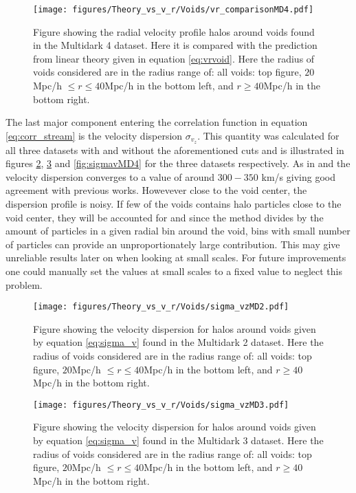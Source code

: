 \begin{figure}[htbp]
    \texttt{[image: figures/Theory\_vs\_v\_r/Voids/vr\_comparisonMD4.pdf]}
    \caption{Figure showing the radial velocity profile halos around voids found in the Multidark 4 dataset. Here it is compared with the prediction from linear theory given in equation \ref{eq:vrvoid}. Here the radius of voids considered are in the radius range of: all voids: top figure, $20$Mpc/h $\leq r\leq 40$Mpc/h in the bottom left, and $r\geq 40$Mpc/h in the bottom right.}
    \label{fig:vrMD4}
\end{figure}
The last major component entering the correlation function in equation \ref{eq:corr_stream} is the velocity dispersion $\sigma_{v_z}$. This quantity was calculated for all three datasets with and without the aforementioned cuts and is illustrated in figures \ref{fig:sigmavMD2}, \ref{fig:sigmavMD3} and \ref{fig:sigmavMD4} for the three datasets respectively. As in \cite{Nadathur_corr} and \cite{Achitouv_streaming} the velocity dispersion converges to a value of around $300-350$ km/s giving good agreement with previous works. Howevever close to the void center, the dispersion profile is noisy. If few of the voids contains halo particles close to the void center, they will be accounted for and since the method divides by the amount of particles in a given radial bin around the void, bins with small number of particles can provide an unproportionately large contribution. This may give unreliable results later on when looking at small scales. For future improvements one could manually set the values at small scales to a fixed value to neglect this problem.
\begin{figure}[htbp]
    \texttt{[image: figures/Theory\_vs\_v\_r/Voids/sigma\_vzMD2.pdf]}
    \caption{Figure showing the velocity dispersion for halos around voids given by equation \ref{eq:sigma_v} found in the Multidark 2 dataset. Here the radius of voids considered are in the radius range of: all voids: top figure, $20$Mpc/h $\leq r\leq 40$Mpc/h in the bottom left, and $r\geq 40$Mpc/h in the bottom right.}
    \label{fig:sigmavMD2}
\end{figure}

\begin{figure}[htbp]
    \texttt{[image: figures/Theory\_vs\_v\_r/Voids/sigma\_vzMD3.pdf]}
    \caption{Figure showing the velocity dispersion for halos around voids given by equation \ref{eq:sigma_v} found in the Multidark 3 dataset. Here the radius of voids considered are in the radius range of: all voids: top figure, $20$Mpc/h $\leq r\leq 40$Mpc/h in the bottom left, and $r\geq 40$Mpc/h in the bottom right.}
    \label{fig:sigmavMD3}
\end{figure}

